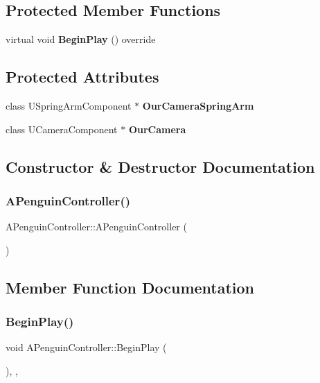 \subsection*{Protected Member Functions}
\begin{DoxyCompactItemize}
\item 
virtual void \textbf{ Begin\+Play} () override
\end{DoxyCompactItemize}
\subsection*{Protected Attributes}
\begin{DoxyCompactItemize}
\item 
class U\+Spring\+Arm\+Component $\ast$ \textbf{ Our\+Camera\+Spring\+Arm}
\item 
class U\+Camera\+Component $\ast$ \textbf{ Our\+Camera}
\end{DoxyCompactItemize}


\subsection{Constructor \& Destructor Documentation}
\mbox{\label{class_a_penguin_controller_a16674b6804557ced10e4bebe7f8cd13d}} 
\subsubsection{APenguinController()}
{\footnotesize\ttfamily A\+Penguin\+Controller\+::\+A\+Penguin\+Controller (\begin{DoxyParamCaption}{ }\end{DoxyParamCaption})}



\subsection{Member Function Documentation}
\mbox{\label{class_a_penguin_controller_a68851e667e8f1347bf5734d715833bb1}} 
\subsubsection{BeginPlay()}
{\footnotesize\ttfamily void A\+Penguin\+Controller\+::\+Begin\+Play (\begin{DoxyParamCaption}{ }\end{DoxyParamCaption})\hspace{0.3cm}{\ttfamily [override]}, {\ttfamily [protected]}, {\ttfamily [virtual]}}

